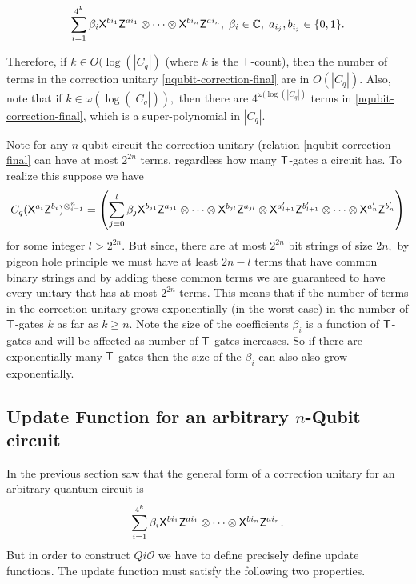 \begin{equation}
\label{nqubit-correction-final}
\sum_{i=1}^{4^k} \beta_i {\sf X}^{b{i_1}} {\sf Z}^{a{i_1}}\otimes \cdots \otimes {\sf X}^{b{i_n}} {\sf Z}^{a{i_n}},\; \beta_i\in\mathbb{C},\; a_{i_j},b_{i_j}\in\{0,1\}.
\end{equation}

Therefore, if $k\in O(\log(|C_q|)$ (where $k$ is the ${\sf T}$-count), then the number of terms in the correction unitary \ref{nqubit-correction-final} are in $O(|C_q|).$ Also, note that if $k\in \omega(\log(|C_q|)),$ then there are $4^{\omega(\log(|C_q|)}$  terms in \ref{nqubit-correction-final}, which is a super-polynomial in $|C_q|.$




\begin{remark}
\label{remark:nqubit-correction2}
Note for any $n$-qubit circuit the correction unitary (relation \ref{nqubit-correction-final} can have at most $2^{2n}$ terms, regardless how many ${\sf T}$-gates a circuit has. To realize this suppose we have
$$C_q ({\sf X}^{a_{i}}{\sf Z}^{b_{i}})^{\otimes_{i=1}^{n}}=\left(\sum_{j=0}^{l} \beta_j {\sf X}^{b_{j1}}{\sf Z}^{a_{j1}} \otimes \cdots \otimes{\sf X}^{b_{jl}}{\sf Z}^{a_{jl}} \otimes {\sf X}^{a_{l+1}^\prime}{\sf Z}^{b_{l+1}^\prime}  \otimes \cdots   \otimes{\sf X}^{a_{n}^\prime}{\sf Z}^{b_{n}^\prime}\right)$$
for some integer $l>2^{2n}.$
But since, there are at most $2^{2n}$ bit strings of size $2n,$ by pigeon hole principle we must have at least $2n-l$ terms that have common binary strings and by adding these common terms we are guaranteed to have every unitary that has at most $2^{2n}$ terms. This means that if the number of terms in the correction unitary grows exponentially (in the worst-case) in the number of ${\sf T}$-gates $k$ as far as $k\geq n.$ Note the size of the coefficients $\beta_i$ is a function of ${\sf T}$-gates and will be affected as number of ${\sf T}$-gates increases. So if there are exponentially many ${\sf T}$-gates then the size of the $\beta_i$ can also also grow exponentially.
\end{remark}


\subsection{Update Function for an arbitrary $n$-Qubit circuit}
\label{nqubit:update-function}
In the previous section saw that the general form of a correction unitary for an arbitrary quantum circuit is $$\sum_{i=1}^{4^k} \beta_i {\sf X}^{b{i_1}} {\sf Z}^{a{i_1}}\otimes \cdots \otimes {\sf X}^{b{i_n}} {\sf Z}^{a{i_n}}.$$ But in order to construct $Qi\mathcal{O}$ we have to define precisely define update functions. The update function must satisfy the following two properties.

